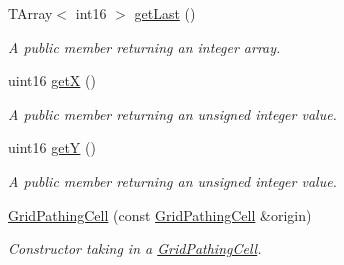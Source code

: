 \begin{DoxyCompactItemize}
T\+Array$<$ int16 $>$ \hyperlink{class_grid_pathing_cell_ad188a53ba82a3ee991f57cc3fdd0fb5f}{get\+Last} ()
\begin{DoxyCompactList}\small\item\em A public member returning an integer array. \end{DoxyCompactList}\item 
uint16 \hyperlink{class_grid_pathing_cell_aa4d5642ce2427123298c94b49ba7967a}{getX} ()
\begin{DoxyCompactList}\small\item\em A public member returning an unsigned integer value. \end{DoxyCompactList}\item 
uint16 \hyperlink{class_grid_pathing_cell_af1690d5798fb128d6bbf850375402ce1}{getY} ()
\begin{DoxyCompactList}\small\item\em A public member returning an unsigned integer value. \end{DoxyCompactList}\item 
\hyperlink{class_grid_pathing_cell_ad249acb6a70659728d0b872a2978fd39}{Grid\+Pathing\+Cell} (const \hyperlink{class_grid_pathing_cell}{Grid\+Pathing\+Cell} \&origin)
\begin{DoxyCompactList}\small\item\em Constructor taking in a \hyperlink{class_grid_pathing_cell}{Grid\+Pathing\+Cell}. \end{DoxyCompactList}\end{DoxyCompactItemize}
